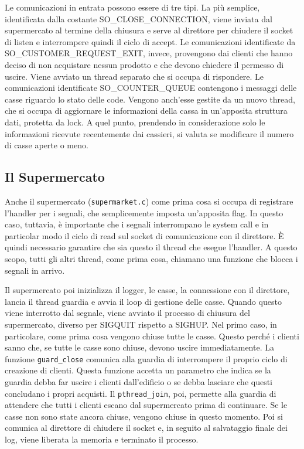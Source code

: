 \documentclass[a4paper,11pt] {article}
\begin{document}
Le comunicazioni in entrata possono essere di tre tipi. La più semplice, identificata dalla costante SO\_CLOSE\_CONNECTION, viene inviata dal supermercato al termine della chiusura e serve al direttore per chiudere il socket di listen e interrompere quindi il ciclo di accept. Le comunicazioni identificate da SO\_CUSTOMER\_REQUEST\_EXIT, invece, provengono dai clienti che hanno deciso di non acquistare nessun prodotto e che devono chiedere il permesso di uscire. Viene avviato un thread separato che si occupa di rispondere. Le comunicazioni identificate SO\_COUNTER\_QUEUE contengono i messaggi delle casse riguardo lo stato delle code. Vengono anch'esse gestite da un nuovo thread, che si occupa di aggiornare le informazioni della cassa in un'apposita struttura dati, protetta da lock. A quel punto, prendendo in considerazione solo le informazioni ricevute recentemente dai cassieri, si valuta se modificare il numero di casse aperte o meno.

\subsection*{Il Supermercato}

Anche il supermercato (\lstinline{supermarket.c}) come prima cosa si occupa di registrare l'handler per i segnali, che semplicemente imposta un'apposita flag. In questo caso, tuttavia, è importante che i segnali interrompano le system call e in particolar modo il ciclo di read sul socket di comunicazione con il direttore. È quindi necessario garantire che sia questo il thread che esegue l'handler. A questo scopo, tutti gli altri thread, come prima cosa, chiamano una funzione che blocca i segnali in arrivo.

Il supermercato poi inizializza il logger, le casse, la connessione con il direttore, lancia il thread guardia e avvia il loop di gestione delle casse. Quando questo viene interrotto dal segnale, viene avviato il processo di chiusura del supermercato, diverso per SIGQUIT rispetto a SIGHUP. Nel primo caso, in particolare, come prima cosa vengono chiuse tutte le casse. Questo perché i clienti sanno che, se tutte le casse sono chiuse, devono uscire immediatamente. La funzione \lstinline{guard_close} comunica alla guardia di interrompere il proprio ciclo di creazione di clienti. Questa funzione accetta un parametro che indica se la guardia debba far uscire i clienti dall'edificio o se debba lasciare che questi concludano i propri acquisti. Il \lstinline{pthread_join}, poi, permette alla guardia di attendere che tutti i clienti escano dal supermercato prima di continuare. Se le casse non sono state ancora chiuse, vengono chiuse in questo momento. Poi si comunica al direttore di chiudere il socket e, in seguito al salvataggio finale dei log, viene liberata la memoria e terminato il processo.
\end{document}
